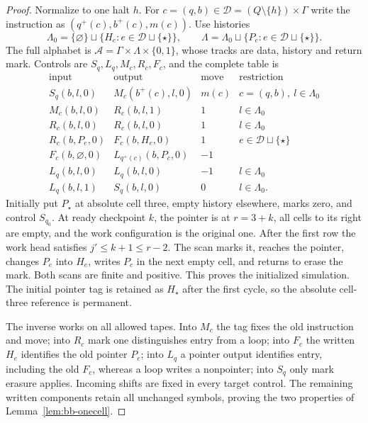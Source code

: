 \begin{proof}\label{bc:recorded-pointer-event-proof}
Normalize to one halt $h$. For $c=(q,b)\in\mathcal D=(Q\setminus\{h\})\times\Gamma$
write the instruction as $(q^+(c),b^+(c),m(c))$.
Use histories
\[
 \Lambda_0=\{\varnothing\}\sqcup\{H_e:e\in\mathcal D\sqcup\{\star\}\},
 \qquad \Lambda=\Lambda_0\sqcup\{P_e:e\in\mathcal D\sqcup\{\star\}\}.
\]
The full alphabet is $\mathcal A=\Gamma\times\Lambda\times\{0,1\}$,
whose tracks are data, history and return mark. Controls are
$S_q,L_q,M_c,R_c,F_c$, and the complete table is
\[
\begin{array}{c|c|c|l}
\text{input}&\text{output}&\text{move}&\text{restriction}\\\hline
S_q(b,l,0)&M_c(b^+(c),l,0)&m(c)&c=(q,b),\ l\in\Lambda_0\\
M_c(b,l,0)&R_c(b,l,1)&1&l\in\Lambda_0\\
R_c(b,l,0)&R_c(b,l,0)&1&l\in\Lambda_0\\
R_c(b,P_e,0)&F_c(b,H_e,0)&1&e\in\mathcal D\sqcup\{\star\}\\
F_c(b,\varnothing,0)&L_{q^+(c)}(b,P_c,0)&-1&\\
L_q(b,l,0)&L_q(b,l,0)&-1&l\in\Lambda_0\\
L_q(b,l,1)&S_q(b,l,0)&0&l\in\Lambda_0.
\end{array}
\]
Initially put $P_\star$ at absolute cell three, empty history elsewhere,
marks zero, and control $S_{q_0}$. At ready checkpoint $k$, the pointer
is at $r=3+k$, all cells to its right are empty, and the work configuration
is the original one. After the first row the work head satisfies
$j'\le k+1\le r-2$. The scan marks it, reaches the pointer, changes
$P_e$ into $H_e$, writes $P_c$ in the next empty cell, and returns to
erase the mark. Both scans are finite and positive. This proves the
initialized simulation. The initial pointer tag is retained as $H_\star$
after the first cycle, so the absolute cell-three reference is permanent.

The inverse works on all allowed tapes. Into $M_c$ the tag fixes the old
instruction and move; into $R_c$ mark one distinguishes entry from a loop;
into $F_c$ the written $H_e$ identifies the old pointer $P_e$; into $L_q$
a pointer output identifies entry, including the old $F_c$, whereas a loop
writes a nonpointer; into $S_q$ only mark erasure applies. Incoming shifts
are fixed in every target control. The remaining written components retain
all unchanged symbols, proving the two properties of
Lemma~\ref{lem:bb-onecell}.


\end{proof}
